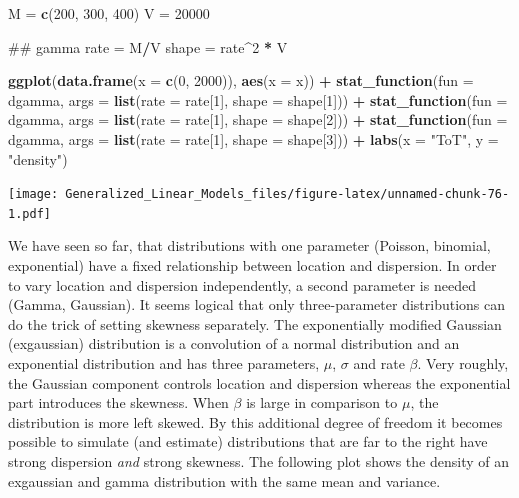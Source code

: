 \documentclass[]{svmono}
\newenvironment{Shaded}{\begin{snugshade}}{\end{snugshade}}
\newcommand{\KeywordTok}[1]{\textcolor[rgb]{0.13,0.29,0.53}{\textbf{#1}}}
\newcommand{\DataTypeTok}[1]{\textcolor[rgb]{0.13,0.29,0.53}{#1}}
\newcommand{\DecValTok}[1]{\textcolor[rgb]{0.00,0.00,0.81}{#1}}
\newcommand{\StringTok}[1]{\textcolor[rgb]{0.31,0.60,0.02}{#1}}
\newcommand{\OperatorTok}[1]{\textcolor[rgb]{0.81,0.36,0.00}{\textbf{#1}}}
\newcommand{\NormalTok}[1]{#1}
\theoremstyle{definition}
\theoremstyle{definition}
\theoremstyle{definition}
\theoremstyle{remark}
\begin{document}
\begin{Shaded}
\begin{Highlighting}[]
\NormalTok{M =}\StringTok{ }\KeywordTok{c}\NormalTok{(}\DecValTok{200}\NormalTok{, }\DecValTok{300}\NormalTok{, }\DecValTok{400}\NormalTok{)}
\NormalTok{V =}\StringTok{ }\DecValTok{20000}

\NormalTok{## gamma}
\NormalTok{rate =}\StringTok{ }\NormalTok{M}\OperatorTok{/}\NormalTok{V}
\NormalTok{shape =}\StringTok{ }\NormalTok{rate}\OperatorTok{^}\DecValTok{2} \OperatorTok{*}\StringTok{ }\NormalTok{V}

\KeywordTok{ggplot}\NormalTok{(}\KeywordTok{data.frame}\NormalTok{(}\DataTypeTok{x =} \KeywordTok{c}\NormalTok{(}\DecValTok{0}\NormalTok{, }\DecValTok{2000}\NormalTok{)), }\KeywordTok{aes}\NormalTok{(}\DataTypeTok{x =}\NormalTok{ x)) }\OperatorTok{+}
\StringTok{  }\KeywordTok{stat_function}\NormalTok{(}\DataTypeTok{fun =}\NormalTok{ dgamma, }
                \DataTypeTok{args =} \KeywordTok{list}\NormalTok{(}\DataTypeTok{rate =}\NormalTok{ rate[}\DecValTok{1}\NormalTok{], }\DataTypeTok{shape =}\NormalTok{ shape[}\DecValTok{1}\NormalTok{])) }\OperatorTok{+}
\StringTok{  }\KeywordTok{stat_function}\NormalTok{(}\DataTypeTok{fun =}\NormalTok{ dgamma, }
                \DataTypeTok{args =} \KeywordTok{list}\NormalTok{(}\DataTypeTok{rate =}\NormalTok{ rate[}\DecValTok{1}\NormalTok{], }\DataTypeTok{shape =}\NormalTok{ shape[}\DecValTok{2}\NormalTok{])) }\OperatorTok{+}
\StringTok{  }\KeywordTok{stat_function}\NormalTok{(}\DataTypeTok{fun =}\NormalTok{ dgamma, }
                \DataTypeTok{args =} \KeywordTok{list}\NormalTok{(}\DataTypeTok{rate =}\NormalTok{ rate[}\DecValTok{1}\NormalTok{], }\DataTypeTok{shape =}\NormalTok{ shape[}\DecValTok{3}\NormalTok{])) }\OperatorTok{+}
\StringTok{  }\KeywordTok{labs}\NormalTok{(}\DataTypeTok{x =} \StringTok{"ToT"}\NormalTok{, }\DataTypeTok{y =} \StringTok{"density"}\NormalTok{)}
\end{Highlighting}
\end{Shaded}

\texttt{[image: Generalized\_Linear\_Models\_files/figure-latex/unnamed-chunk-76-1.pdf]}

We have seen so far, that distributions with one parameter (Poisson,
binomial, exponential) have a fixed relationship between location and
dispersion. In order to vary location and dispersion independently, a
second parameter is needed (Gamma, Gaussian). It seems logical that only
three-parameter distributions can do the trick of setting skewness
separately. The exponentially modified Gaussian (exgaussian)
distribution is a convolution of a normal distribution and an
exponential distribution and has three parameters, \(\mu\), \(\sigma\)
and rate \(\beta\). Very roughly, the Gaussian component controls
location and dispersion whereas the exponential part introduces the
skewness. When \(\beta\) is large in comparison to \(\mu\), the
distribution is more left skewed. By this additional degree of freedom
it becomes possible to simulate (and estimate) distributions that are
far to the right have strong dispersion \emph{and} strong skewness. The
following plot shows the density of an exgaussian and gamma distribution
with the same mean and variance.
\end{document}
